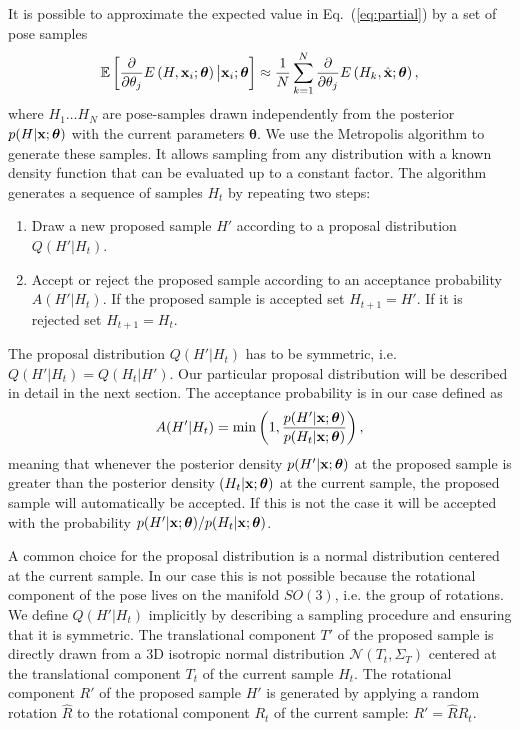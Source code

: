 \documentclass[10pt,letterpaper]{article}
\newcommand{\btheta}{\boldsymbol\theta}
\newcommand{\bx}{{\bf x}}
\begin{document}
It is possible to approximate the expected value in Eq.~(\ref{eq:partial}) by a set of pose samples 
\begin{equation} \label{eq:sampling}
	\mathbb{E}\left[
	\frac
		{\partial }
		{{\partial \theta_j}} E\left(H,\bx_i;\btheta \right)
	\big| \bx_i ;\btheta \right]
	\approx
	\frac{1}{N}\sum_{k=1}^N
	\frac
		{\partial}
		{{\partial \theta_j}} E\left(H_k,\hat\bx;\btheta \right),
\end{equation}
where $H_1 \dots H_{N}$ are pose-samples drawn independently from the posterior $p(H| \bx ;\btheta)$ with the current parameters $\btheta$. We use the Metropolis algorithm \cite{metropolis} to generate these samples. It allows sampling from any distribution with a known density function that can be evaluated up to a constant factor. The algorithm generates a sequence of samples $H_t$ by repeating two steps:
\begin{enumerate}
  \item Draw a new proposed sample $H'$ according to a proposal distribution $Q(H'|H_t)$.
  \item Accept or reject the proposed sample according to an acceptance probability $A(H'|H_t)$. If the proposed sample is accepted set $H_{t+1}=H'$. If it is rejected set  $H_{t+1}=H_t$.
\end{enumerate}
The proposal distribution $Q(H'|H_t)$ has to be symmetric, i.e. $Q(H'|H_t)=Q(H_t|H')$. Our particular proposal distribution will be described in detail in the next section. The acceptance probability is in our case defined as
\begin{equation} \label{eq:acceptance}
	A(H'|H_t)=\min \left(1,
	\frac{p(H'| \bx ;\btheta)}
		{p(H_t| \bx ;\btheta)}
	\right),
\end{equation}
meaning that  whenever the posterior density $p(H'| \bx ;\btheta)$ at the proposed sample is greater than the posterior density  $(H_t| \bx ;\btheta)$ at the current sample, the proposed sample will automatically be accepted. If this is not the case it will be accepted with the probability $p(H'| \bx ;\btheta)/p(H_t| \bx ;\btheta)$.

A common choice for the proposal distribution is a normal distribution centered at the current sample. In our case this is not possible because the rotational component of the pose lives on the manifold $SO(3)$, i.e. the group of rotations. We define $Q(H'|H_t)$ implicitly by describing a sampling procedure and ensuring that it is symmetric. The translational component $T'$ of the proposed sample is directly drawn from a 3D isotropic normal distribution $\mathcal{N}(T_t,{ \Sigma}_T)$ centered at the translational component $T_t$ of the current sample $H_t$. The rotational component $R'$ of the proposed sample $H'$ is generated by applying a random rotation $\hat{R}$ to the rotational component $R_t$ of the current sample:
$R' = \hat{R} R_t$.
\end{document}
